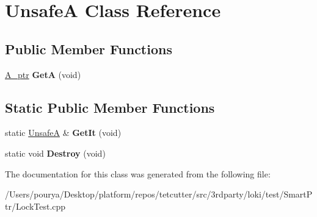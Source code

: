 \hypertarget{classUnsafeA}{}\section{Unsafe\+A Class Reference}
\label{classUnsafeA}
\subsection*{Public Member Functions}
\begin{DoxyCompactItemize}
\item 
\hypertarget{classUnsafeA_a61c3fd0250591e3dcbd51b370b4401ca}{}\hyperlink{classLoki_1_1StrongPtr}{A\+\_\+ptr} {\bfseries Get\+A} (void)\label{classUnsafeA_a61c3fd0250591e3dcbd51b370b4401ca}

\end{DoxyCompactItemize}
\subsection*{Static Public Member Functions}
\begin{DoxyCompactItemize}
\item 
\hypertarget{classUnsafeA_a5278232abed40ff9420606b3cfdb7602}{}static \hyperlink{classUnsafeA}{Unsafe\+A} \& {\bfseries Get\+It} (void)\label{classUnsafeA_a5278232abed40ff9420606b3cfdb7602}

\item 
\hypertarget{classUnsafeA_a30108e7083a2616178c118f613d86a06}{}static void {\bfseries Destroy} (void)\label{classUnsafeA_a30108e7083a2616178c118f613d86a06}

\end{DoxyCompactItemize}


The documentation for this class was generated from the following file\+:\begin{DoxyCompactItemize}
\item 
/\+Users/pourya/\+Desktop/platform/repos/tetcutter/src/3rdparty/loki/test/\+Smart\+Ptr/Lock\+Test.\+cpp\end{DoxyCompactItemize}
